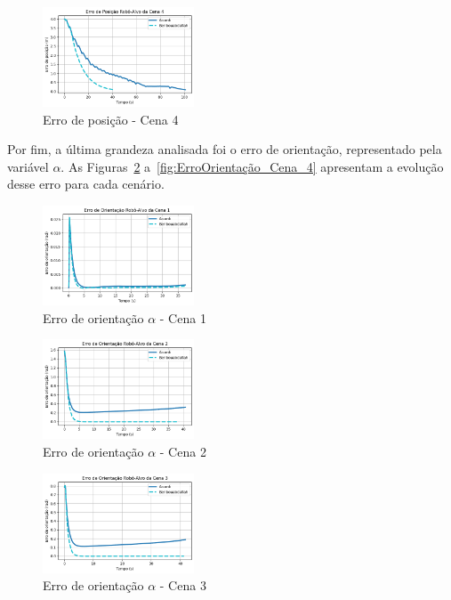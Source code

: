 \documentclass[conference]{IEEEtran}
\begin{document}
\begin{figure}[h!]
    \centering
    \includegraphics[width=0.4\textwidth]{Figuras/ErroPosição_Cena_4.png}
    \caption{Erro de posição - Cena 4}
    \label{fig:ErroPosição_Cena_4}
\end{figure}

Por fim, a última grandeza analisada foi o erro de orientação, representado pela variável $\alpha$. As Figuras~\ref{fig:ErroOrientação_Cena_1} a~\ref{fig:ErroOrientação_Cena_4} apresentam a evolução desse erro para cada cenário.

\begin{figure}[h!]
    \centering
    \includegraphics[width=0.4\textwidth]{Figuras/ErroOrientação_Cena_1.png}
    \caption{Erro de orientação $\alpha$ - Cena 1}
    \label{fig:ErroOrientação_Cena_1}
\end{figure}

\begin{figure}[h!]
    \centering
    \includegraphics[width=0.4\textwidth]{Figuras/ErroOrientação_Cena_2.png}
    \caption{Erro de orientação $\alpha$ - Cena 2}
    \label{fig:ErroOrientação_Cena_2}
\end{figure}

\begin{figure}[h!]
    \centering
    \includegraphics[width=0.4\textwidth]{Figuras/ErroOrientação_Cena_3.png}
    \caption{Erro de orientação $\alpha$ - Cena 3}
    \label{fig:ErroOrientação_Cena_3}
\end{figure}
\end{document}
